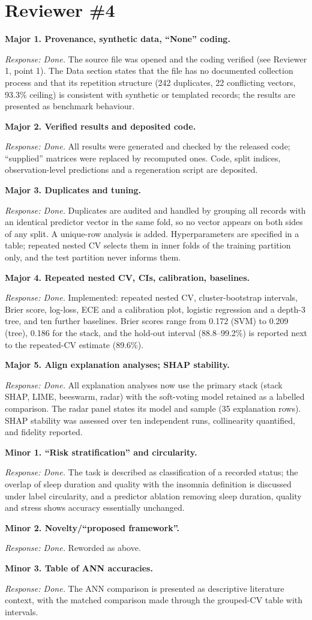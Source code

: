 \documentclass[11pt,a4paper]{article}
\newcommand{\rc}[2]{\par\medskip\noindent\textbf{#1}\par\noindent\textit{Response: Done.} #2\par}
\begin{document}
\section*{Reviewer \#4}
\rc{Major 1. Provenance, synthetic data, ``None'' coding.}{The source file was opened and the coding verified (see Reviewer 1, point 1). The Data section states that the file has no documented collection process and that its repetition structure (242 duplicates, 22 conflicting vectors, 93.3\% ceiling) is consistent with synthetic or templated records; the results are presented as benchmark behaviour.}
\rc{Major 2. Verified results and deposited code.}{All results were generated and checked by the released code; ``supplied'' matrices were replaced by recomputed ones. Code, split indices, observation-level predictions and a regeneration script are deposited.}
\rc{Major 3. Duplicates and tuning.}{Duplicates are audited and handled by grouping all records with an identical predictor vector in the same fold, so no vector appears on both sides of any split. A unique-row analysis is added. Hyperparameters are specified in a table; repeated nested CV selects them in inner folds of the training partition only, and the test partition never informs them.}
\rc{Major 4. Repeated nested CV, CIs, calibration, baselines.}{Implemented: repeated nested CV, cluster-bootstrap intervals, Brier score, log-loss, ECE and a calibration plot, logistic regression and a depth-3 tree, and ten further baselines. Brier scores range from 0.172 (SVM) to 0.209 (tree), 0.186 for the stack, and the hold-out interval (88.8--99.2\%) is reported next to the repeated-CV estimate (89.6\%).}
\rc{Major 5. Align explanation analyses; SHAP stability.}{All explanation analyses now use the primary stack (stack SHAP, LIME, beeswarm, radar) with the soft-voting model retained as a labelled comparison. The radar panel states its model and sample (35 explanation rows). SHAP stability was assessed over ten independent runs, collinearity quantified, and fidelity reported.}
\rc{Minor 1. ``Risk stratification'' and circularity.}{The task is described as classification of a recorded status; the overlap of sleep duration and quality with the insomnia definition is discussed under label circularity, and a predictor ablation removing sleep duration, quality and stress shows accuracy essentially unchanged.}
\rc{Minor 2. Novelty/``proposed framework''.}{Reworded as above.}
\rc{Minor 3. Table of ANN accuracies.}{The ANN comparison is presented as descriptive literature context, with the matched comparison made through the grouped-CV table with intervals.}
\end{document}
